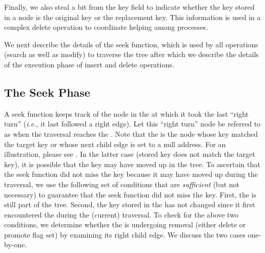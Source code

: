 \begin{limitscope}
Finally, we also steal a bit from the key field to indicate whether the key stored in a node is the original key or the replacement key. This information is used in a complex delete operation to coordinate helping among processes.


We next describe the details of the seek function, which is used by all operations (search as well as modify) to traverse the tree after which we describe the details of 
the execution phase of insert and delete operations.

\subsection{The Seek Phase}
A seek function keeps track of the node in the \accesspath{} at which it took the last ``right turn'' (\emph{i.e.}, it last followed a right edge). Let this ``right turn'' node be referred to as \emph{\anchornode} when the traversal reaches the \terminalnode{}. Note that the \terminalnode{} is the node whose key matched the target key or whose next child edge is set to a null address. For an illustration, please see . In the latter case (stored key does not match the target key), it is possible that the key may have moved up in the tree. To ascertain that the seek function did not miss the key because it may have moved up during the traversal, we use the following set of conditions that are \emph{sufficient} (but not necessary) to guarantee that the seek function did not miss the key. First, the \anchornode{} is still part of the tree. Second, the key stored in the \anchornode{} has not changed since it first encountered the \anchornode{} during the (current) traversal. To check for the above two conditions, we determine whether the \anchornode{} is undergoing removal (either delete or promote flag set) by examining its right child edge. We discuss the two cases one-by-one.

\begin{enumerate}[leftmargin=*, label=(\alph*), noitemsep]


\end{enumerate}
\end{limitscope}
